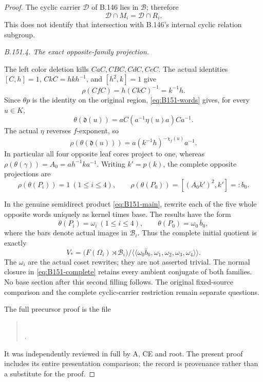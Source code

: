 \begin{proof}
The cyclic carrier \(\mathcal D\) of B.146 lies in \(\mathcal B\);
therefore
\[
 \mathcal D\cap M_i=\mathcal D\cap R_i.
\]
This does not identify that intersection with B.146's internal
cyclic relation subgroup.

\emph{B.151.4. The exact opposite-family projection.}\par
\noindent The left color deletion kills \(CaC,CBC,CdC,CeC\).
The actual identities
\([C,h]=1\), \(CkC=hkh^{-1}\), and \([h^2,k]=1\) give
\[
 \rho(CfC)=h(CkC)^{-1}=k^{-1}h.
\]
Since \(\theta p\) is the identity on the original region,
\eqref{eq:B151-words} gives, for every \(u\in K\),
\[
 \theta(\mathfrak d(u))
       =aC(a^{-1}\eta(u)a)Ca^{-1}.
\]
The actual \(\eta\) reverses \(f\)-exponent, so
\begin{equation}\label{eq:B151-color}
 \rho(\theta(\mathfrak d(u)))
       =a(k^{-1}h)^{-\chi_f(u)}a^{-1}.
\end{equation}
In particular all four opposite leaf cores project to one,
whereas \(\rho(\theta(\gamma))=A_0=ah^{-1}ka^{-1}\).
Writing \(k'=p(k)\), the complete opposite projections are
\begin{equation}\label{eq:B151-opposite-square}
 \rho(\theta(P_i))=1\ (1\le i\le4),\qquad
 \rho(\theta(P_0))=[(A_0k')^2,k']=:b_0.
\end{equation}

In the genuine semidirect product \eqref{eq:B151-main},
rewrite each of the five whole opposite words uniquely as
kernel times base. The results have the form
\[
 \theta(P_i)=\omega_i\ (1\le i\le4),\qquad
 \theta(P_0)=\omega_0\,\overline b_0,
\]
where the bars denote actual images in \(\mathcal B_i\).
Thus the complete initial quotient is exactly
\begin{equation}\label{eq:B151-complete}
 V_*=
 \bigl(F(\Omega_i)\rtimes\mathcal B_i\bigr)/
 \langle\!\langle
 \omega_0\overline b_0,\omega_1,\omega_2,\omega_3,\omega_4
 \rangle\!\rangle.
\end{equation}
The \(\omega_i\) are the actual coset rewrites; they are not
asserted trivial. The normal closure in \eqref{eq:B151-complete}
retains every ambient conjugate of both families. No base
section after this second filling follows. The original
fixed-source comparison and the complete cyclic-carrier
restriction remain separate questions.

\smallskip\noindent
The full precursor proof is the file
\begin{quote}\small
{}\\
.
\end{quote}
It was independently reviewed in full by A, CE and root. The present
proof includes its entire presentation comparison; the record
is provenance rather than a substitute for the proof.
\end{proof}
